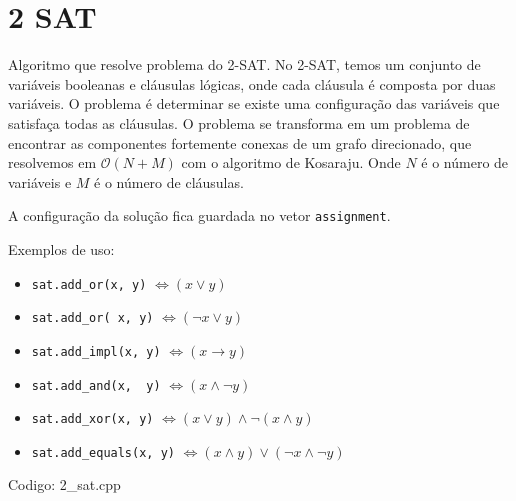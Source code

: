 \documentclass[10pt, a4paper, oneside]{book}
\begin{document}
\section{2 SAT}


Algoritmo que resolve problema do 2-SAT. No 2-SAT, temos um conjunto de variáveis booleanas e cláusulas lógicas, onde cada cláusula é composta por duas variáveis. O problema é determinar se existe uma configuração das variáveis que satisfaça todas as cláusulas. O problema se transforma em um problema de encontrar as componentes fortemente conexas de um grafo direcionado, que resolvemos em $\mathcal{O}(N + M)$ com o algoritmo de Kosaraju. Onde $N$ é o número de variáveis e $M$ é o número de cláusulas.  



A configuração da solução fica guardada no vetor \texttt{assignment}.



Exemplos de uso:



\begin{itemize}
\item \texttt{sat.add\_or(x, y)} $\Leftrightarrow (x \lor y)$
\item \texttt{sat.add\_or(~x, y)} $\Leftrightarrow (\lnot x \lor y)$
\item \texttt{sat.add\_impl(x, y)} $\Leftrightarrow (x \rightarrow y)$
\item \texttt{sat.add\_and(x, ~y)} $\Leftrightarrow (x \land \lnot y)$
\item \texttt{sat.add\_xor(x, y)} $\Leftrightarrow (x \lor y) \land \lnot (x \land y)$
\item \texttt{sat.add\_equals(x, y)} $\Leftrightarrow (x \land y) \lor (\lnot x \land \lnot y)$
\end{itemize}

\hfill

Codigo: 2\_sat.cpp
\end{document}
